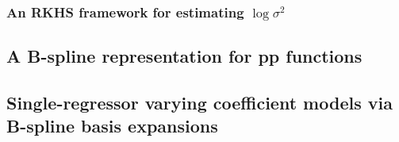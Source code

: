\documentclass[12pt]{article}
\theoremstyle{definition}
\begin{document}
\subsubsection{An RKHS framework for estimating $\log \sigma^2$}










%



\subsection{A B-spline representation for pp functions}





\subsection{Single-regressor varying coefficient models via B-spline basis expansions}
\end{document}
